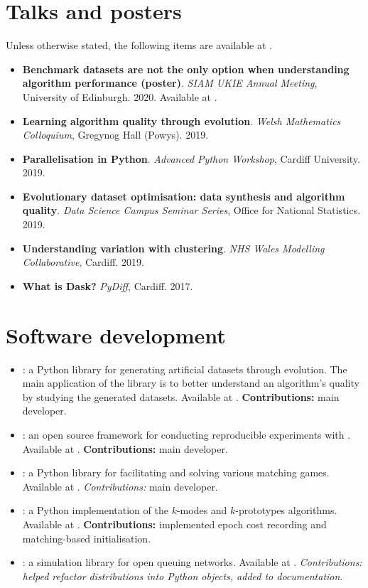 \section*{Talks and posters}

Unless otherwise stated, the following items are available at
.

\begin{itemize}
    \item \textbf{Benchmark datasets are not the only option when understanding
        algorithm performance (poster)}. \emph{SIAM UKIE Annual Meeting},
        University of Edinburgh. 2020. Available at
        . 
    \item \textbf{Learning algorithm quality through evolution}. \emph{Welsh
        Mathematics Colloquium}, Gregynog Hall (Powys). 2019.
    \item \textbf{Parallelisation in Python}. \emph{Advanced Python Workshop},
        Cardiff University. 2019.
    \item \textbf{Evolutionary dataset optimisation: data synthesis and
        algorithm quality}. \emph{Data Science Campus Seminar Series}, Office
        for National Statistics. 2019.
    \item \textbf{Understanding variation with clustering}. \emph{NHS Wales
        Modelling Collaborative}, Cardiff. 2019.
    \item \textbf{What is Dask?} \emph{PyDiff}, Cardiff. 2017.
\end{itemize}

\section*{Software development}

\begin{itemize}
    \item \edo: a Python library for generating artificial datasets through
        evolution. The main application of the library is to better understand
        an algorithm's quality by studying the generated datasets. Available
        at . \textbf{Contributions:} main developer.
    \item \edolab: an open source framework for conducting reproducible
        experiments with \edo. Available at .
        \textbf{Contributions:} main developer.
    \item \matching: a Python library for facilitating and solving various
        matching games. Available at .
        \emph{Contributions:} main developer.
    \item \kmodes: a Python implementation of the \(k\)-modes and
        \(k\)-prototypes algorithms. Available at .
        \textbf{Contributions:} implemented epoch cost recording and matching-based
        initialisation.
    \item \ciw: a simulation library for open queuing networks. Available at
        . \emph{Contributions: helped refactor
        distributions into Python objects, added to documentation}.
\end{itemize}
